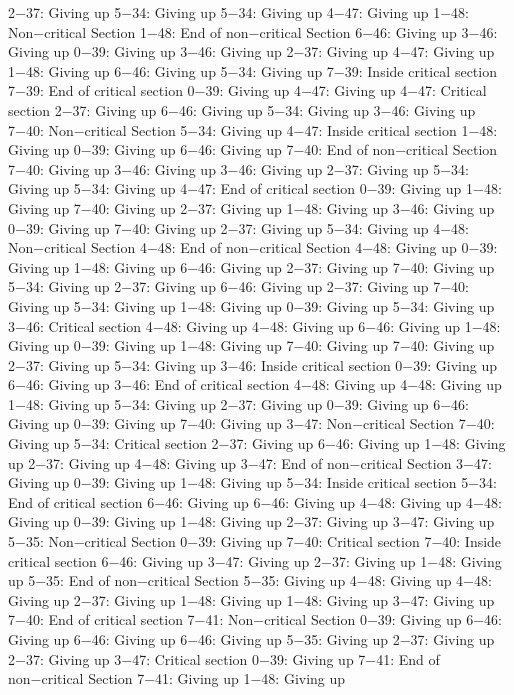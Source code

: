 2−37: Giving up
5−34: Giving up
5−34: Giving up
4−47: Giving up
1−48: Non−critical Section
1−48: End of non−critical Section
6−46: Giving up
3−46: Giving up
0−39: Giving up
3−46: Giving up
2−37: Giving up
4−47: Giving up
1−48: Giving up
6−46: Giving up
5−34: Giving up
7−39: Inside critical section
7−39: End of critical section
0−39: Giving up
4−47: Giving up
4−47: Critical section
2−37: Giving up
6−46: Giving up
5−34: Giving up
3−46: Giving up
7−40: Non−critical Section
5−34: Giving up
4−47: Inside critical section
1−48: Giving up
0−39: Giving up
6−46: Giving up
7−40: End of non−critical Section
7−40: Giving up
3−46: Giving up
3−46: Giving up
2−37: Giving up
5−34: Giving up
5−34: Giving up
4−47: End of critical section
0−39: Giving up
1−48: Giving up
7−40: Giving up
2−37: Giving up
1−48: Giving up
3−46: Giving up
0−39: Giving up
7−40: Giving up
2−37: Giving up
5−34: Giving up
4−48: Non−critical Section
4−48: End of non−critical Section
4−48: Giving up
0−39: Giving up
1−48: Giving up
6−46: Giving up
2−37: Giving up
7−40: Giving up
5−34: Giving up
2−37: Giving up
6−46: Giving up
2−37: Giving up
7−40: Giving up
5−34: Giving up
1−48: Giving up
0−39: Giving up
5−34: Giving up
3−46: Critical section
4−48: Giving up
4−48: Giving up
6−46: Giving up
1−48: Giving up
0−39: Giving up
1−48: Giving up
7−40: Giving up
7−40: Giving up
2−37: Giving up
5−34: Giving up
3−46: Inside critical section
0−39: Giving up
6−46: Giving up
3−46: End of critical section
4−48: Giving up
4−48: Giving up
1−48: Giving up
5−34: Giving up
2−37: Giving up
0−39: Giving up
6−46: Giving up
0−39: Giving up
7−40: Giving up
3−47: Non−critical Section
7−40: Giving up
5−34: Critical section
2−37: Giving up
6−46: Giving up
1−48: Giving up
2−37: Giving up
4−48: Giving up
3−47: End of non−critical Section
3−47: Giving up
0−39: Giving up
1−48: Giving up
5−34: Inside critical section
5−34: End of critical section
6−46: Giving up
6−46: Giving up
4−48: Giving up
4−48: Giving up
0−39: Giving up
1−48: Giving up
2−37: Giving up
3−47: Giving up
5−35: Non−critical Section
0−39: Giving up
7−40: Critical section
7−40: Inside critical section
6−46: Giving up
3−47: Giving up
2−37: Giving up
1−48: Giving up
5−35: End of non−critical Section
5−35: Giving up
4−48: Giving up
4−48: Giving up
2−37: Giving up
1−48: Giving up
1−48: Giving up
3−47: Giving up
7−40: End of critical section
7−41: Non−critical Section
0−39: Giving up
6−46: Giving up
6−46: Giving up
6−46: Giving up
5−35: Giving up
2−37: Giving up
2−37: Giving up
3−47: Critical section
0−39: Giving up
7−41: End of non−critical Section
7−41: Giving up
1−48: Giving up
